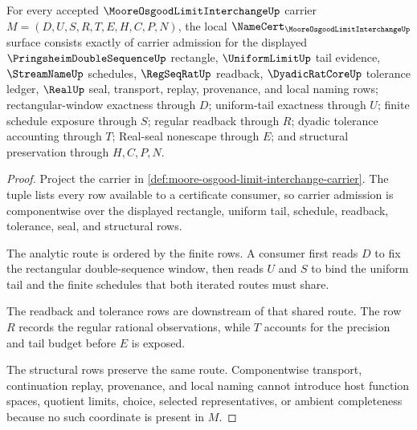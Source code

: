 \begin{theorem}
\label{thm:moore-osgood-limit-interchange-namecert-obligations}
For every accepted $\MooreOsgoodLimitInterchangeUp$ carrier $M=(D,U,S,R,T,E,H,C,P,N)$, the local $\NameCert_{\MooreOsgoodLimitInterchangeUp}$ surface consists exactly of carrier admission for the displayed $\PringsheimDoubleSequenceUp$ rectangle, $\UniformLimitUp$ tail evidence, $\StreamNameUp$ schedules, $\RegSeqRatUp$ readback, $\DyadicRatCoreUp$ tolerance ledger, $\RealUp$ seal, transport, replay, provenance, and local naming rows; rectangular-window exactness through $D$; uniform-tail exactness through $U$; finite schedule exposure through $S$; regular readback through $R$; dyadic tolerance accounting through $T$; Real-seal nonescape through $E$; and structural preservation through $H,C,P,N$.
\end{theorem}
\begin{proof}
Project the carrier in \autoref{def:moore-osgood-limit-interchange-carrier}. The tuple lists every row available to a certificate consumer, so carrier admission is componentwise over the displayed rectangle, uniform tail, schedule, readback, tolerance, seal, and structural rows.

The analytic route is ordered by the finite rows. A consumer first reads $D$ to fix the rectangular double-sequence window, then reads $U$ and $S$ to bind the uniform tail and the finite schedules that both iterated routes must share.

The readback and tolerance rows are downstream of that shared route. The row $R$ records the regular rational observations, while $T$ accounts for the precision and tail budget before $E$ is exposed.

The structural rows preserve the same route. Componentwise transport, continuation replay, provenance, and local naming cannot introduce host function spaces, quotient limits, choice, selected representatives, or ambient completeness because no such coordinate is present in $M$.
\end{proof}

